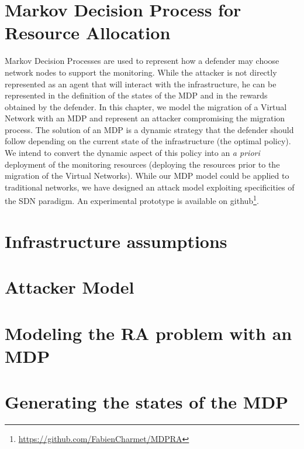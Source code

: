 \section{Markov Decision Process for Resource Allocation}

Markov Decision Processes are used to represent how a defender may choose network nodes to support the monitoring.
While the attacker is not directly represented as an agent that will interact with the infrastructure, he can be represented in the definition of the states of the MDP and in the rewards obtained by the defender.
In this chapter, we model the migration of a Virtual Network with an MDP and represent an attacker compromising the migration process.
The solution of an MDP is a dynamic strategy that the defender should follow depending on the current state of the infrastructure (\ie the optimal policy).
We intend to convert the dynamic aspect of this policy into an \textit{a priori} deployment of the monitoring resources (\ie deploying the resources prior to the migration of the Virtual Networks).
While our MDP model could be applied to traditional networks, we have designed an attack model exploiting specificities of the SDN paradigm. 
An experimental prototype is available on github\footnote{\label{github}\url{https://github.com/FabienCharmet/MDPRA}}.



% 



\section{Infrastructure assumptions}



\section{Attacker Model}


\section{Modeling the RA problem with an MDP}


\section{Generating the states of the MDP}
 

